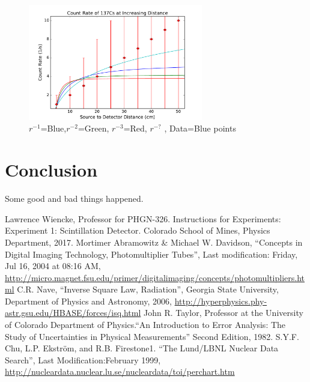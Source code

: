 \documentclass[10pt,letterpaper]{journal}
\begin{document}
\begin{figure}[H]
\begin{center}
  \includegraphics[width=3in]{dist_fit.pdf}                                              
\end{center}  
\caption{$r^{-1}$=Blue,$r^{-2}$=Green, $r^{-3}$=Red, $r^{-?}$ , Data=Blue points}                                      
\end{figure}

\section{Conclusion}
Some good and bad things happened.

\newpage
\begin{thebibliography}{99}

   Lawrence Wiencke, Professor for PHGN-326.  Instructions for Experiments: Experiment 1: Scintillation Detector. Colorado School of Mines, Physics Department, 2017.  
   Mortimer Abramowitz \& Michael W. Davidson, ``Concepts in Digital Imaging Technology, Photomultiplier Tubes'', Last modification: Friday, Jul 16, 2004 at 08:16 AM, \url{http://micro.magnet.fsu.edu/primer/digitalimaging/concepts/photomultipliers.html}
	 C.R. Nave, ``Inverse Square Law, Radiation'', Georgia State University, Department of Physics and Astronomy, 2006, \url{http://hyperphysics.phy-astr.gsu.edu/HBASE/forces/isq.html}
   John R. Taylor, Professor at the University of Colorado Department of Physics.``An Introduction to Error Analysis: The Study of Uncertainties in Physical Measurements'' Second Edition, 1982.
   S.Y.F. Chu, L.P. Ekström, and R.B. Firestone1. ``The Lund/LBNL Nuclear Data Search'', Last Modification:February 1999, \url{http://nucleardata.nuclear.lu.se/nucleardata/toi/perchart.htm}
\end{thebibliography}
\end{document}
